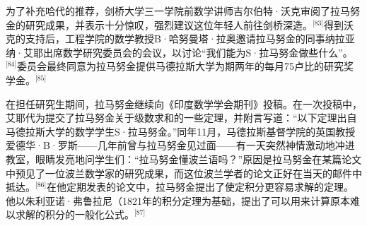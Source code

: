 为了补充哈代的推荐，剑桥大学三一学院前数学讲师吉尔伯特·沃克审阅了拉马努金的研究成果，并表示十分惊叹，强烈建议这位年轻人前往剑桥深造。\(^\text{[83]}\)得到沃克的支持后，工程学院的数学教授B·哈努曼塔·拉奥邀请拉马努金的同事纳拉亚纳·艾耶出席数学研究委员会的会议，以讨论“我们能为S·拉马努金做些什么”。\(^\text{[84]}\)委员会最终同意为拉马努金提供马德拉斯大学为期两年的每月75卢比的研究奖学金。\(^\text{[85]}\)

在担任研究生期间，拉马努金继续向《印度数学学会期刊》投稿。在一次投稿中，艾耶代为提交了拉马努金关于级数求和的一些定理，并附言写道：“以下定理出自马德拉斯大学的数学学生S·拉马努金。”同年11月，马德拉斯基督学院的英国教授爱德华·B·罗斯——几年前曾与拉马努金见过面——有一天突然神情激动地冲进教室，眼睛发亮地问学生们：“拉马努金懂波兰语吗？”原因是拉马努金在某篇论文中预见了一位波兰数学家的研究成果，而这位波兰学者的论文正好在当天的邮件中抵达。\(^\text{[86]}\)在他定期发表的论文中，拉马努金提出了使定积分更容易求解的定理。他以朱利亚诺·弗鲁拉尼（1821年的积分定理为基础，提出了可以用来计算原本难以求解的积分的一般化公式。\(^\text{[87]}\)
